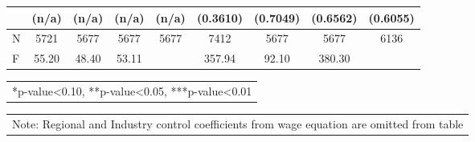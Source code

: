 \documentclass[12pt]{report}
\begin{document}
\begin{sidewaystable}
\begin{tabular}{lc|c|c|c|c|c|c|c}
& (n/a) & (n/a) & (n/a) & (n/a) & (0.3610) & (0.7049) & (0.6562) & (0.6055)\\
\hline
N & 5721 & 5677 & 5677 & 5677 & 7412 & 5677 & 5677 & 6136\\
F & 55.20 & 48.40 & 53.11 & & 357.94 & 92.10 & 380.30 & \\
\hline
\hline
\end{tabular}
\begin{tabular}{p{6.25in}}\footnotesize{
*p-value<0.10, **p-value<0.05, ***p-value<0.01}\\
\end{tabular}
\begin{tabular}{p{6.25in}}\footnotesize{
Note: Regional and Industry control coefficients from wage equation are omitted from table}\\
\end{tabular}
\end{sidewaystable}

\begin{comment}R-sq & 0.2362 & -0.1351 & -0.5394 & -0.5152 & 0.4039 & -0.8122 & -1.0526 & -1.1441\\
\end{comment}

\newpage
\end{document}
